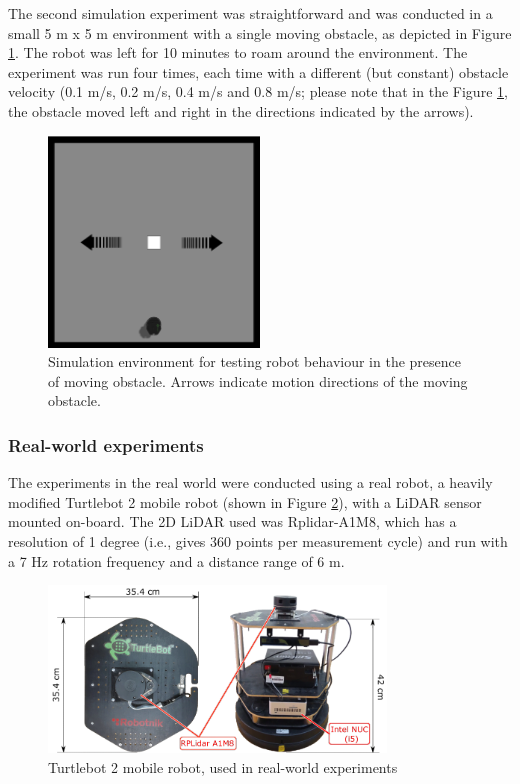 The second simulation experiment was straightforward and was conducted in a small 5 m x 5 m environment with a single moving obstacle, as depicted in Figure \ref{fig:Fig07}. The robot was left for 10 minutes to roam around the environment. The experiment was run four times, each time with a different (but constant) obstacle velocity (0.1 m/s, 0.2 m/s, 0.4 m/s and 0.8 m/s; please note that in the Figure \ref{fig:Fig07}, the obstacle moved left and right in the directions indicated by the arrows). 

\begin{figure}
    \centering
    \includegraphics[width=0.5\textwidth]{slike/Fig03_06.png}
    \caption{Simulation environment for testing robot behaviour in the presence of moving obstacle. Arrows indicate motion directions of the moving obstacle.}
    \label{fig:Fig07}
\end{figure}

\subsubsection{Real-world experiments}

The experiments in the real world were conducted using a real robot, a heavily modified Turtlebot 2 mobile robot (shown in Figure \ref{fig:Fig08}), with a LiDAR sensor mounted on-board. The 2D LiDAR used was Rplidar-A1M8, which has a resolution of 1 degree (i.e., gives 360 points per measurement cycle) and run with a 7 Hz rotation frequency and a distance range of 6 m. 

\begin{figure}
    \centering
    \includegraphics[width=0.8\textwidth]{slike/Fig03_07.png}
    \caption{Turtlebot 2 mobile robot, used in real-world experiments}
    \label{fig:Fig08}
\end{figure}

